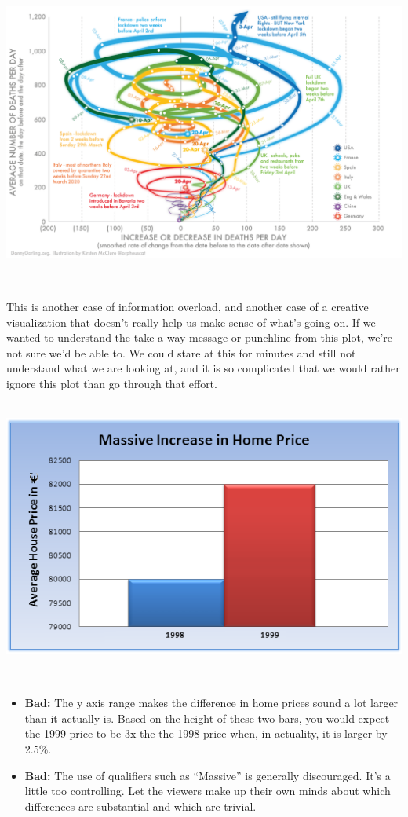 \documentclass[
]{book}
\begin{document}
\includegraphics{img/vis10.png}

~

This is another case of information overload, and another case of a creative visualization that doesn't really help us make sense of what's going on. If we wanted to understand the take-a-way message or punchline from this plot, we're not sure we'd be able to. We could stare at this for minutes and still not understand what we are looking at, and it is so complicated that we would rather ignore this plot than go through that effort.

~\\

\includegraphics{img/vis11.png}

~

\begin{itemize}
\item
  \textbf{Bad:} The y axis range makes the difference in home prices sound a lot larger than it actually is. Based on the height of these two bars, you would expect the 1999 price to be 3x the the 1998 price when, in actuality, it is larger by 2.5\%.
\item
  \textbf{Bad:} The use of qualifiers such as ``Massive'' is generally discouraged. It's a little too controlling. Let the viewers make up their own minds about which differences are substantial and which are trivial.
\end{itemize}
\end{document}
